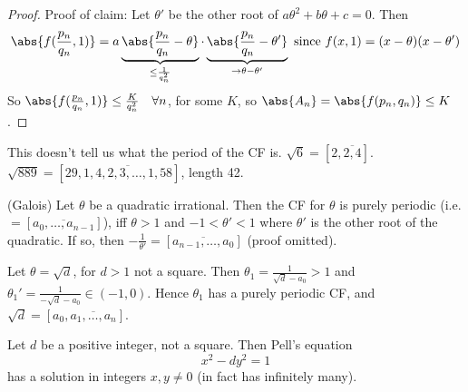 \documentclass{article}
\begin{document}
\begin{proof}
    Proof of claim: Let $\theta'$ be the other root of $a \theta^2 + b \theta + c=0$. Then
    \begin{equation*}
        \abs{f(\frac{p_n}{q_n}, 1)} = a \underbrace{\abs{\frac{p_n}{q_n}-\theta}}_{\leq \frac{1}{q_n^2}} \cdot \underbrace{\abs{\frac{p_n}{q_n}-\theta'}}_{\to \theta - \theta'} \text{ since } f(x, 1) = (x - \theta)(x - \theta')
    \end{equation*}
    So $\abs{f(\frac{p_n}{q_n}, 1)} \leq \frac{K}{q_n^2} \quad \forall n$, for some $K$, so $\abs{A_n} = \abs{f(p_n, q_n)} \leq K$.
\end{proof}

\begin{remark}
    This doesn't tell us what the period of the CF is. $\sqrt{6} = [2, \overline{2, 4}]$.
    $\sqrt{889} = [29, \overline{1, 4, 2, 3, \dotsc, 1, 58}]$, length 42.
\end{remark}

\begin{nthm}\label{thm:6.8}
    (Galois) Let $\theta$ be a quadratic irrational.
    Then the CF for $\theta$ is purely periodic (i.e. $=[\overline{a_0, \dotsc, a_{n-1}}]$), iff $\theta > 1$ and $-1 < \theta' < 1$ where $\theta'$ is the other root of the quadratic.
    If so, then $-\frac{1}{\theta'} = [\overline{a_{n-1}, \dotsc, a_0}]$ (proof omitted).
\end{nthm}

\begin{remark}
    Let $\theta = \sqrt{d}$, for $d > 1$ not a square. Then $\theta_1 = \frac{1}{\sqrt{d} - a_0} > 1$ and $\theta_1' = \frac{1}{-\sqrt{d}-a_0} \in (-1, 0)$.
    Hence $\theta_1$ has a purely periodic CF, and $\sqrt{d} = [a_0, \overline{a_1, \dotsc, a_n}]$.
\end{remark}

\begin{nthm}\label{thm:6.9}
    Let $d$ be a positive integer, not a square. Then Pell's equation
    \begin{equation*}
        x^2 - d y^2 = 1 \tag{$*$} \label{eq:pell}
    \end{equation*}
    has a solution in integers $x, y \neq 0$ (in fact has infinitely many).
\end{nthm}
\end{document}
